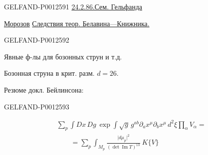 \begin{GelfandAdjacentEvidence}{GELFAND-P001259}{1}
\underline{24.2.86.}\qquad\underline{Сем. Гельфанда}

\underline{\underline{Морозов}}\qquad
\underline{Следствия теор. Белавина—Книжника.}
\end{GelfandAdjacentEvidence}
\begin{GelfandAdjacentEvidence}{GELFAND-P001259}{2}


Явные ф-лы для бозонных струн и т.д.

Бозонная струна в крит. разм. $d=26$.

Резюме докл. Бейлинсона:
\end{GelfandAdjacentEvidence}
\begin{GelfandAdjacentEvidence}{GELFAND-P001259}{3}

\begin{equation*}
\begin{aligned}
&\sum_p\int Dx\,Dg\ \exp\int\sqrt g\,g^{ab}\partial_a x^\mu\partial_b x^\mu\,d^2\xi\prod_\alpha V_\alpha={}\\
&\qquad=\sum_p\int_{M_p}\frac{\lvert d\mu_p\rvert^2}{(\det\operatorname{Im}T)^{13}}\ K\{V\}
\end{aligned}\tag{1}
\end{equation*}
\end{GelfandAdjacentEvidence}
